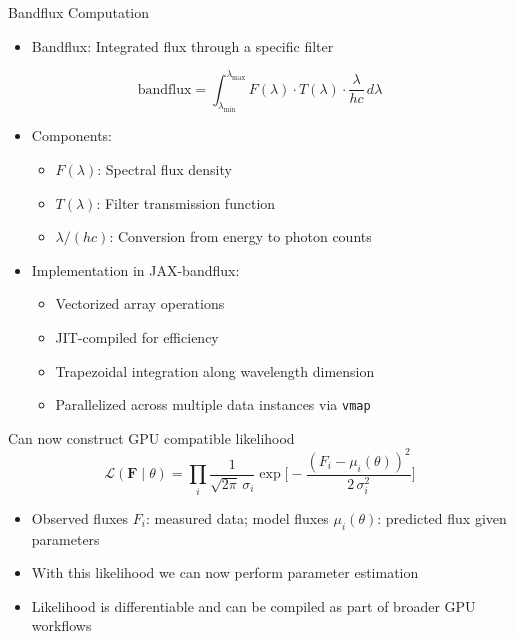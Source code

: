 \documentclass[aspectratio=169]{beamer}
\begin{document}
\begin{frame}{Bandflux Computation}
  \begin{itemize}
    \item Bandflux: Integrated flux through a specific filter
  \end{itemize}
  
  \begin{equation}
    \text{bandflux} = \int_{\lambda_\text{min}}^{\lambda_\text{max}} F(\lambda) \cdot T(\lambda) \cdot \frac{\lambda}{hc} \, d\lambda
  \end{equation}
  
  \begin{itemize}
    \item Components:
      \begin{itemize}
        \item $F(\lambda)$: Spectral flux density
        \item $T(\lambda)$: Filter transmission function
        \item $\lambda/(hc)$: Conversion from energy to photon counts
      \end{itemize}
    \item Implementation in JAX-bandflux:
      \begin{itemize}
        \item Vectorized array operations
        \item JIT-compiled for efficiency
        \item Trapezoidal integration along wavelength dimension
        \item Parallelized across multiple data instances via \texttt{vmap}
      \end{itemize}
  \end{itemize}
\end{frame}

\begin{frame}{Can now construct GPU compatible likelihood}
  \[
    \mathcal{L}(\mathbf{F}\mid\theta)
      = \prod_{i} \frac{1}{\sqrt{2\pi}\,\sigma_i}
        \exp\!\Bigg[-\frac{(F_i - \mu_i(\theta))^2}{2\,\sigma_i^2}\Bigg]
  \]
  \begin{itemize}
    \item Observed fluxes \(F_i\): measured data; model fluxes \(\mu_i(\theta)\): predicted flux given parameters
    \item With this likelihood we can now perform parameter estimation
    \item Likelihood is differentiable and can be compiled as part of broader GPU workflows
  \end{itemize}
\end{frame}
\end{document}
